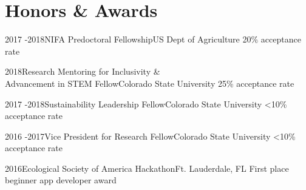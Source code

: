 \documentclass[letterpaper]{twentysecondcv} %
\begin{document}
%



\section{Honors \& Awards}

\begin{twenty} %

\twentyitem
    	{2017 -}{2018}{NIFA Predoctoral Fellowship}{US Dept of Agriculture}
        {20\% acceptance rate \vspace{0.4mm} }
        {}    

\twentyitem
    	{2018}{}{Research Mentoring for Inclusivity \& \\Advancement in STEM Fellow}{Colorado State University}
        {25\% acceptance rate \vspace{0.6mm} }
        { {} }  

\twentyitem
    	{2017 -}{2018}{Sustainability Leadership Fellow}{Colorado State University}
        {<10\% acceptance rate \vspace{0.6mm} }
        { {} } 

\twentyitem
    	{2016 -}{2017}{Vice President for Research Fellow}{Colorado State University}
        {<10\% acceptance rate \vspace{0.6mm} }
        { {} }  
        
\twentyitem
    	{2016}{}{Ecological Society of America Hackathon}{Ft. Lauderdale, FL}
        {First place beginner app developer award \vspace{0.6mm} }
        { {} }  
        
\end{twenty}
\end{document}

